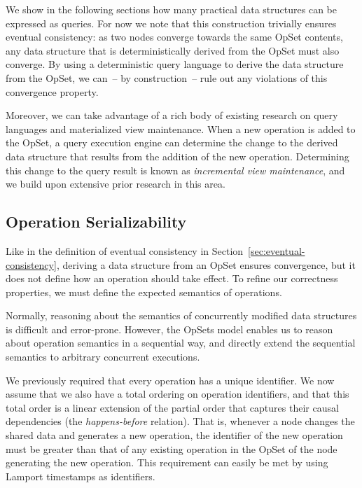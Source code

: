 We show in the following sections how many practical data structures can be expressed as queries.
For now we note that this construction trivially ensures eventual consistency: as two nodes converge towards the same OpSet contents, any data structure that is deterministically derived from the OpSet must also converge.
By using a deterministic query language to derive the data structure from the OpSet, we can~-- by construction~-- rule out any violations of this convergence property.

Moreover, we can take advantage of a rich body of existing research on query languages and materialized view maintenance.
When a new operation is added to the OpSet, a query execution engine can determine the change to the derived data structure that results from the addition of the new operation.
Determining this change to the query result is known as \emph{incremental view maintenance}, and we build upon extensive prior research in this area.

\subsection{Operation Serializability}\label{sec:op-serial}

Like in the definition of eventual consistency in Section~\ref{sec:eventual-consistency}, deriving a data structure from an OpSet ensures convergence, but it does not define how an operation should take effect.
To refine our correctness properties, we must define the expected semantics of operations.

Normally, reasoning about the semantics of concurrently modified data structures is difficult and error-prone.
However, the OpSets model enables us to reason about operation semantics in a sequential way, and directly extend the sequential semantics to arbitrary concurrent executions.

We previously required that every operation has a unique identifier.
We now assume that we also have a total ordering on operation identifiers, and that this total order is a linear extension of the partial order that captures their causal dependencies (the \emph{happens-before} relation).
That is, whenever a node changes the shared data and generates a new operation, the identifier of the new operation must be greater than that of any existing operation in the OpSet of the node generating the new operation.
This requirement can easily be met by using Lamport timestamps \cite{Lamport:1978jq} as identifiers.

